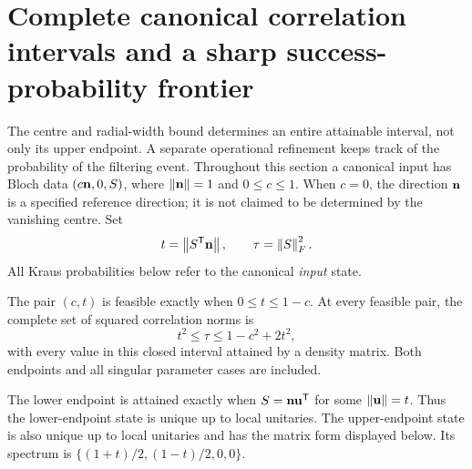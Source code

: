 \section{Complete canonical correlation intervals and a sharp success-probability frontier}
\label{sec:probability-frontier}

The centre and radial-width bound determines an entire attainable interval,
not only its upper endpoint. A separate operational refinement keeps track of
the probability of the filtering event. Throughout this section a canonical
input has Bloch data $(c\mathbf n,0,S)$, where $\left\lVert\mathbf n\right\rVert=1$ and $0\leq c\leq1$.
When $c=0$, the direction $\mathbf n$ is a specified reference direction; it is not
claimed to be determined by the vanishing centre. Set
\[
 t=\left\lVert S^{\mathsf T}\mathbf n\right\rVert,\qquad \tau=\left\lVert S\right\rVert_F^2.
\]
All Kraus probabilities below refer to the canonical \emph{input} state.

\begin{theorem}\label{thm:canonical-interval-v2}
The pair $(c,t)$ is feasible exactly when $0\leq t\leq1-c$. At every feasible
pair, the complete set of squared correlation norms is
\begin{equation}\label{eq:canonical-full-interval-v2}
 \boxed{\quad t^2\leq\tau\leq1-c^2+2t^2,\quad}
\end{equation}
with every value in this closed interval attained by a density matrix.
Both endpoints and all singular parameter cases are included.

The lower endpoint is attained exactly when $S=\mathbf n\mathbf u^{\mathsf T}$ for
some $\left\lVert\mathbf u\right\rVert=t$. Thus the lower-endpoint state is unique up to local
unitaries. The upper-endpoint state is also unique up to local unitaries and
has the matrix form displayed below. Its spectrum is
$\{(1+t)/2,(1-t)/2,0,0\}$.
\end{theorem}

